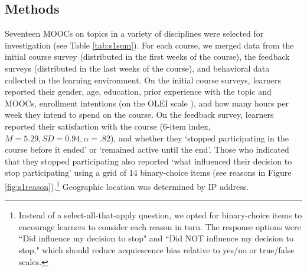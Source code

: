 \documentclass{sigchi}\usepackage[]{graphicx}\usepackage[]{color}
\begin{document}
\subsection{Methods}

Seventeen MOOCs on topics in a variety of disciplines were selected for investigation (see Table \ref{tab:s1sum}). For each course, we merged data from the initial course survey (distributed in the first weeks of the course), the feedback surveys (distributed in the last weeks of the course), and behavioral data collected in the learning environment. 
On the initial course surveys, learners reported their gender, age, education, prior experience with the topic and MOOCs, enrollment intentions (on the OLEI scale \cite{kizilcec2015motivation}), and how many hours per week they intend to spend on the course. On the feedback survey, learners reported their satisfaction with the course (6-item index, $M=5.29, SD=0.94, \alpha=.82$), and whether they `stopped participating in the course before it ended' or `remained active until the end'. Those who indicated that they stopped participating also reported `what influenced their decision to stop participating' using a grid of 14 binary-choice items (see reasons in Figure \ref{fig:s1reason}).\footnote{Instead of a select-all-that-apply question, we opted for binary-choice items to encourage learners to consider each reason in turn. The response options were ``Did influence my decision to stop" and ``Did NOT influence my decision to stop," which should reduce acquiescence bias relative to yes/no or true/false scales.} Geographic location was determined by IP address.
\end{document}
